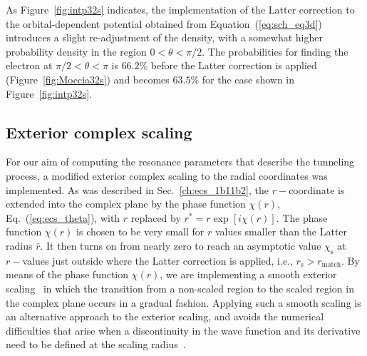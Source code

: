 As Figure~\ref{fig:intp32s} indicates, the implementation of the
Latter correction to the orbital-dependent potential obtained from
Equation~(\ref{eq:sch_eq3d}) introduces a slight re-adjustment of the
density, with a somewhat higher probability density in the region $0 <
\theta < \pi/2$. The probabilities for finding the electron at $\pi/2
< \theta < \pi$ is $66.2\%$ before the Latter correction is applied
(Figure~\ref{fig:Moccia32s}) and becomes $63.5\%$ for the case shown
in Figure~\ref{fig:intp32s}.

\subsection{Exterior complex scaling}
\label{ch:3a1_ecs}

For our aim of computing the resonance parameters that describe the
tunneling process, a modified exterior complex scaling to the radial
coordinates was implemented. As was described in
Sec.~\ref{ch:ecs_1b11b2}, the $r-$coordinate is extended into the
complex plane by the phase function $\chi(r)$,
Eq.~(\ref{eq:ecs_theta}), with $r$ replaced by $r^{*} =
r\exp[i\chi(r)]$. The phase function $\chi(r)$ is chosen to be very
small for $r$ values smaller than the Latter radius $\bar{r}$. It then
turns on from nearly zero to reach an asymptotic value
$\chi_{\mathrm{s}}$ at $r-$values just outside where the Latter
correction is applied, i.e., $r_{\mathrm{s}} > r_{\mathrm{match}}$. By
means of the phase function $\chi(r)$, we are implementing a smooth
exterior scaling~\cite{Moiseyev_NHQM} in which the transition from a
non-scaled region to the scaled region in the complex plane occurs in
a gradual fashion. Applying such a smooth scaling is an alternative
approach to the exterior scaling, and avoids the numerical
difficulties that arise when a discontinuity in the wave function and
its derivative need to be defined at the scaling
radius~\cite{ecsScrinzi}.



